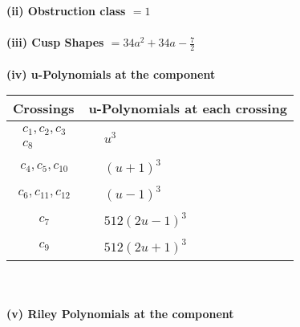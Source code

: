 \documentclass[1p]{elsarticle_modified}
\theoremstyle{definition}
\begin{document}
\flushleft \textbf{(ii) Obstruction class $= 1$}\\~\\
\flushleft \textbf{(iii) Cusp Shapes $= 34 a^2+34 a-\frac{7}{2}$}\\~\\
\newpage\renewcommand{\arraystretch}{1}
\flushleft \textbf{(iv) u-Polynomials at the component}\newline \\
\begin{tabular}{m{50pt}|m{274pt}}
Crossings & \hspace{64pt}u-Polynomials at each crossing \\
\hline $$\begin{aligned}c_{1},c_{2},c_{3}\\c_{8}\end{aligned}$$&$\begin{aligned}
&u^3
\end{aligned}$\\
\hline $$\begin{aligned}c_{4},c_{5},c_{10}\end{aligned}$$&$\begin{aligned}
&(u+1)^3
\end{aligned}$\\
\hline $$\begin{aligned}c_{6},c_{11},c_{12}\end{aligned}$$&$\begin{aligned}
&(u-1)^3
\end{aligned}$\\
\hline $$\begin{aligned}c_{7}\end{aligned}$$&$\begin{aligned}
&512(2 u-1)^3
\end{aligned}$\\
\hline $$\begin{aligned}c_{9}\end{aligned}$$&$\begin{aligned}
&512(2 u+1)^3
\end{aligned}$\\
\hline
\end{tabular}\\~\\
\newpage\renewcommand{\arraystretch}{1}
\flushleft \textbf{(v) Riley Polynomials at the component}\newline \\
\end{document}
